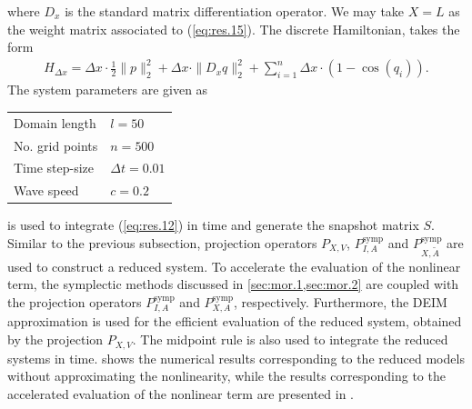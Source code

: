 where $D_x$ is the standard matrix differentiation operator. We may take $X = L$ as the weight matrix associated to (\ref{eq:res.15}). The discrete Hamiltonian, takes the form
\begin{eqnarray} \label{eq:res.17}
	H_{\Delta x} = \Delta x \cdot \frac 1 2 \| p \|^2_2 + \Delta x \cdot \| D_x q \|^2_2 + \sum_{i=1}^{n} \Delta x \cdot ( 1 - \cos(q_i) ).
\end{eqnarray}
The system parameters are given as
\vspace{0.5cm}
\begin{center}
\begin{tabular}{|l|l|}
\hline
Domain length & $l = 50$ \\
No. grid points & $n = 500$ \\
Time step-size & $\Delta t = 0.01$ \\
Wave speed & $c=0.2$ \\
\hline
\end{tabular}
\end{center}
\vspace{0.5cm}
 is used to integrate (\ref{eq:res.12}) in time and generate the snapshot matrix $S$. Similar to the previous subsection, projection operators $P_{X,V}$, $P^{\text{symp}}_{I,A}$ and $P^{\text{symp}}_{X,\tilde A}$ are used to construct a reduced system. To accelerate the evaluation of the nonlinear term, the symplectic methods discussed in \cref{sec:mor.1,sec:mor.2} are coupled with the projection operators $P^{\text{symp}}_{I,A}$ and $P^{\text{symp}}_{X,A}$, respectively. Furthermore, the DEIM approximation is used for the efficient evaluation of the reduced system, obtained by the projection $P_{X,V}$. The midpoint rule is also used to integrate the reduced systems in time.  shows the numerical results corresponding to the reduced models without approximating the nonlinearity, while the results corresponding to the accelerated evaluation of the nonlinear term are presented in .

